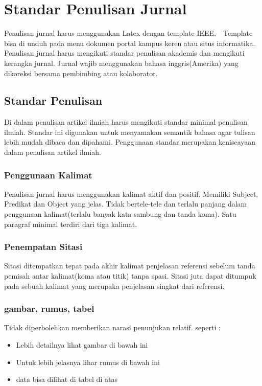 \chapter{Standar Penulisan Jurnal}

Penulisan jurnal harus menggunakan Latex dengan template IEEE.　Template bisa di unduh pada menu dokumen portal kampus keren atau situs informatika. Penulisan jurnal harus mengikuti standar penulisan akademis dan mengikuti kerangka jurnal. Jurnal wajib menggunakan bahasa inggris(Amerika) yang dikoreksi bersama pembimbing atau kolaborator. 

\section{Standar Penulisan}
Di dalam penulisan artikel ilmiah harus mengikuti standar minimal penulisan ilmiah. Standar ini digunakan untuk menyamakan semantik bahasa agar tulisan lebih mudah dibaca dan dipahami. Penggunaan standar merupakan keniscayaan dalam penulisan artikel ilmiah.
\subsection{Penggunaan Kalimat}
Penulisan jurnal harus menggunakan kalimat aktif dan positif. Memiliki Subject, Predikat dan Object yang jelas. Tidak bertele-tele dan terlalu panjang dalam penggunaan kalimat(terlalu banyak kata sambung dan tanda koma). Satu paragraf minimal terdiri dari tiga kalimat.
\subsection{Penempatan Sitasi}
Sitasi ditempatkan tepat pada akhir kalimat penjelasan referensi sebelum tanda pemisah antar kalimat(koma atau titik) tanpa spasi. Sitasi juta dapat ditumpuk pada sebuah kalimat yang merupaka  penjelasan singkat dari referensi. 
\subsection{gambar, rumus, tabel}
Tidak diperbolehkan memberikan narasi penunjukan relatif. seperti :
\begin{itemize}
	\item Lebih detailnya lihat gambar di bawah ini
	\item Untuk lebih jelasnya lihar rumus di bawah ini
	\item data bisa dilihat di tabel di atas
\end{itemize}

